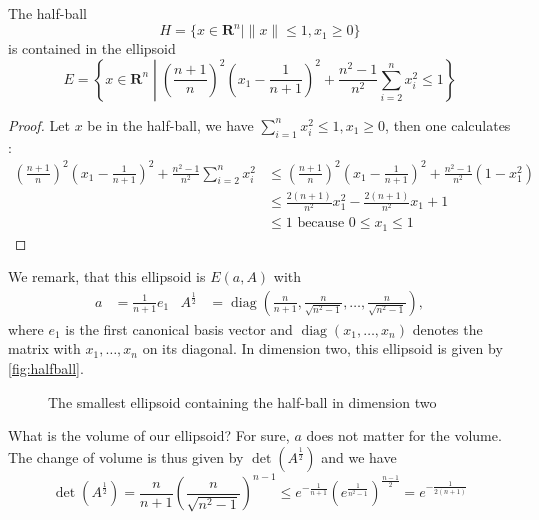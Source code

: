\documentclass[10pt]{article}
\newcommand{\R}{\mathbf{R}}
\newcommand{\diag}{\operatorname{diag}}
\begin{document}
\begin{lemma}\label{lem:halfball}
The half-ball
\[
H = \{x \in \R^n | \| x \| \le 1, x_1 \ge 0 \}
\]
is contained in the ellipsoid
\[
E = \left\{ x \in \R^n \middle| \left(\frac{n+1}{n}\right)^2\left(x_1 - \frac{1}{n+1}\right)^2 + \frac{n^2-1}{n^2} \sum_{i=2}^n x_i^2 \le 1 \right\}
\]
\end{lemma}
\begin{proof}
Let $x$ be in the half-ball, we have $\sum_{i=1}^n x_i^2 \le 1, x_1 \ge 0$, then one calculates :
\begin{align*}
\left(\frac{n+1}{n} \right)^2 \left(x_1-\frac{1}{n+1}\right)^2 + \frac{n^2-1}{n^2} \sum_{i=2}^n x_i^2 
&\leq \left(\frac{n+1}{n} \right)^2 \left(x_1-\frac{1}{n+1}\right)^2 + \frac{n^2-1}{n^2}(1 - x_1^2)\\
&\leq \frac{2(n+1)}{n^2} x_1^2-\frac{2(n+1)}{n^2}x_1 + 1\\
&\leq 1 \text{ because } 0 \leq x_1 \leq 1
\end{align*}
\end{proof}


We remark, that this ellipsoid is $E(a,A)$ with
\begin{align*}
a &= \frac{1}{n+1} e_1 &  A^{\frac{1}{2}}&= \diag \left(\frac{n}{n+1}, \frac{n}{\sqrt{n^2-1}}, \dots, \frac{n}{\sqrt{n^2-1}}\right),
\end{align*}
where $e_1$ is the first canonical basis vector and $\diag (x_1, \dots, x_n)$ denotes the matrix with $x_1, \dots, x_n$ on its diagonal. In dimension two, this ellipsoid is given by \autoref{fig:halfball}.
\begin{figure}
\centering
{}
\caption{The smallest ellipsoid containing the half-ball in dimension two}
\label{fig:halfball}
\end{figure}
What is the volume of our ellipsoid? For sure, $a$ does not matter for the volume. The change of volume is thus given by $\det (A^{\frac{1}{2}})$ and we have
\[
\det (A^{\frac{1}{2}}) = \frac{n}{n+1} (\frac{n}{\sqrt{n^2-1}})^{n-1} \le e^{-\frac{1}{n+1}} (e^{\frac{1}{n^2-1}})^{\frac{n-1}{2}} = e^{-\frac{1}{2(n+1)}}
\]
\end{document}
